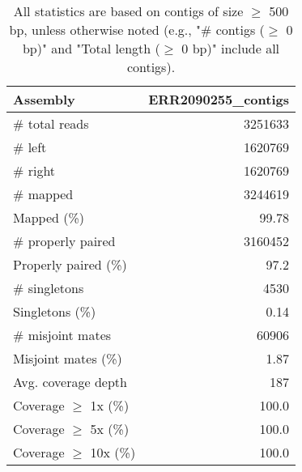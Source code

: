 \documentclass[12pt,a4paper]{article}
\begin{document}
\begin{table}[ht]
\begin{center}
\caption{All statistics are based on contigs of size $\geq$ 500 bp, unless otherwise noted (e.g., "\# contigs ($\geq$ 0 bp)" and "Total length ($\geq$ 0 bp)" include all contigs).}
\begin{tabular}{|l*{1}{|r}|}
\hline
Assembly & ERR2090255\_contigs \\ \hline
\# total reads & 3251633 \\ \hline
\# left & 1620769 \\ \hline
\# right & 1620769 \\ \hline
\# mapped & 3244619 \\ \hline
Mapped (\%) & 99.78 \\ \hline
\# properly paired & 3160452 \\ \hline
Properly paired (\%) & 97.2 \\ \hline
\# singletons & 4530 \\ \hline
Singletons (\%) & 0.14 \\ \hline
\# misjoint mates & 60906 \\ \hline
Misjoint mates (\%) & 1.87 \\ \hline
Avg. coverage depth & 187 \\ \hline
Coverage $\geq$ 1x (\%) & 100.0 \\ \hline
Coverage $\geq$ 5x (\%) & 100.0 \\ \hline
Coverage $\geq$ 10x (\%) & 100.0 \\ \hline
\end{tabular}
\end{center}
\end{table}
\end{document}

